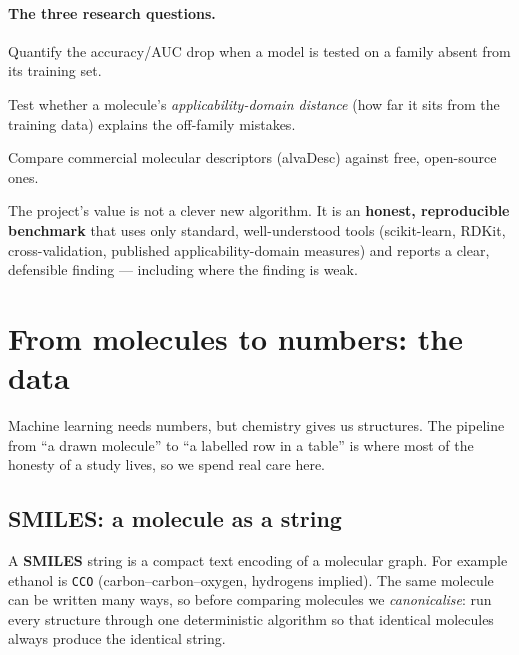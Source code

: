 \documentclass[11pt]{article}
\newenvironment{callout}[2][blue]{%
  \par\smallskip\colorlet{shadecolor}{#1!7}%
  \begin{shaded}\noindent{\color{#1!55!black}\bfseries #2.\ }\ignorespaces}%
  {\end{shaded}\smallskip}
\newcommand{\code}[1]{\texttt{#1}}
\begin{document}
\paragraph{The three research questions.}
\begin{description}[leftmargin=1.6em,style=nextline]
  \item[RQ1 --- How badly does transfer fail?] Quantify the accuracy/AUC drop when
    a model is tested on a family absent from its training set.
  \item[RQ2 --- Can we predict when it will fail?] Test whether a molecule's
    \emph{applicability-domain distance} (how far it sits from the training data)
    explains the off-family mistakes.
  \item[RQ3 --- Do expensive descriptors help?] Compare commercial molecular
    descriptors (alvaDesc) against free, open-source ones.
\end{description}

\begin{callout}[blue]{Key idea}
The project's value is not a clever new algorithm. It is an \textbf{honest,
reproducible benchmark} that uses only standard, well-understood tools
(scikit-learn, RDKit, cross-validation, published applicability-domain measures)
and reports a clear, defensible finding --- including where the finding is weak.
\end{callout}

\section{From molecules to numbers: the data}\label{sec:data}

Machine learning needs numbers, but chemistry gives us structures. The pipeline
from ``a drawn molecule'' to ``a labelled row in a table'' is where most of the
honesty of a study lives, so we spend real care here.

\subsection{SMILES: a molecule as a string}
A \textbf{SMILES} string is a compact text encoding of a molecular graph. For
example ethanol is \code{CCO} (carbon--carbon--oxygen, hydrogens implied). The
same molecule can be written many ways, so before comparing molecules we
\emph{canonicalise}: run every structure through one deterministic algorithm so
that identical molecules always produce the identical string.
\end{document}
